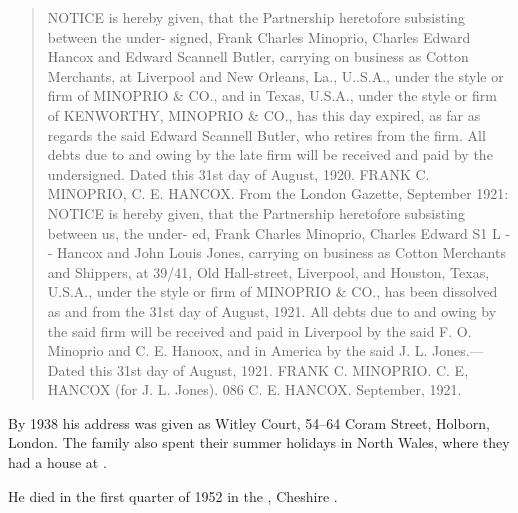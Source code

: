 \begin{quotation}
NOTICE is hereby given, that the Partnership heretofore subsisting between the under- signed, Frank Charles Minoprio, Charles Edward Hancox and Edward Scannell Butler, carrying on business as Cotton Merchants, at Liverpool and New Orleans, La., U..S.A., under the style or firm of MINOPRIO \& CO., and in Texas, U.S.A., under the style or firm of KENWORTHY, MINOPRIO \& CO., has this day expired, as far as regards the said Edward Scannell Butler, who retires from the firm. All debts due to and owing by the late firm will be received and paid by the undersigned. Dated this 31st day of August, 1920. FRANK C. MINOPRIO, C. E. HANCOX. From the London Gazette, September 1921: NOTICE is hereby given, that the Partnership heretofore subsisting between us, the under- ed, Frank Charles Minoprio, Charles Edward S1 L - - Hancox and John Louis Jones, carrying on business as Cotton Merchants and Shippers, at 39/41, Old Hall-street, Liverpool, and Houston, Texas, U.S.A., under the style or firm of MINOPRIO \& CO., has been dissolved as and from the 31st day of August, 1921. All debts due to and owing by the said firm will be received and paid in Liverpool by the said F. O. Minoprio and C. E. Hanoox, and in America by the said J. L. Jones.—Dated this 31st day of August, 1921. FRANK C. MINOPRIO. C. E, HANCOX (for J. L. Jones). 086 C. E. HANCOX. September, 1921.
\end{quotation}

By 1938 his address was given as Witley Court, 54--64 Coram Street, Holborn, London.\cite{CharlesEdwardHancoxLondonhouse}  The family also spent their summer holidays in North Wales, where they had a house at .

He died in the first quarter of 1952 in the , Cheshire \cite{CEHancoxDeath}.
